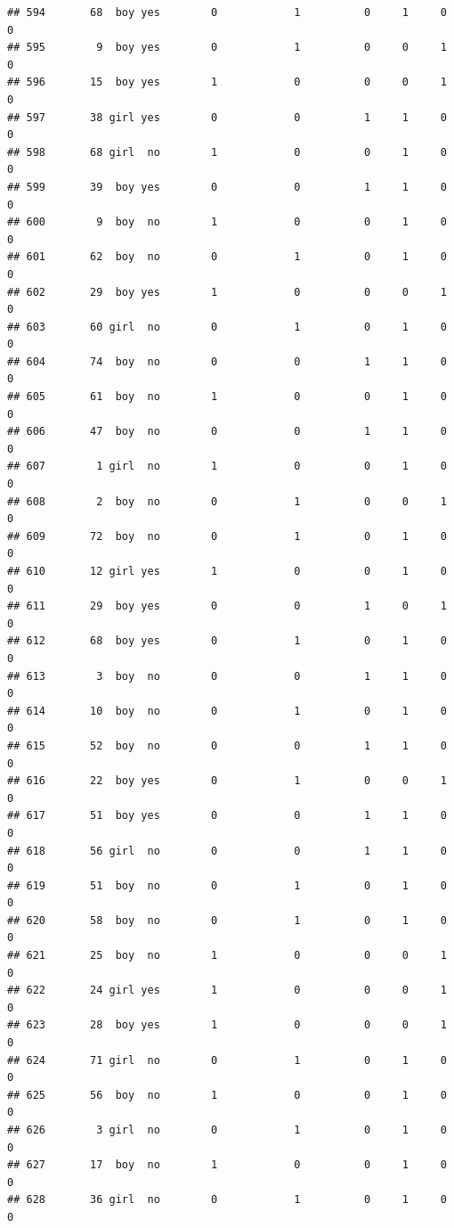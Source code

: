 \documentclass[man]{apa6}
\begin{document}
\begin{verbatim}
## 594       68  boy yes        0            1          0     1     0     0
## 595        9  boy yes        0            1          0     0     1     0
## 596       15  boy yes        1            0          0     0     1     0
## 597       38 girl yes        0            0          1     1     0     0
## 598       68 girl  no        1            0          0     1     0     0
## 599       39  boy yes        0            0          1     1     0     0
## 600        9  boy  no        1            0          0     1     0     0
## 601       62  boy  no        0            1          0     1     0     0
## 602       29  boy yes        1            0          0     0     1     0
## 603       60 girl  no        0            1          0     1     0     0
## 604       74  boy  no        0            0          1     1     0     0
## 605       61  boy  no        1            0          0     1     0     0
## 606       47  boy  no        0            0          1     1     0     0
## 607        1 girl  no        1            0          0     1     0     0
## 608        2  boy  no        0            1          0     0     1     0
## 609       72  boy  no        0            1          0     1     0     0
## 610       12 girl yes        1            0          0     1     0     0
## 611       29  boy yes        0            0          1     0     1     0
## 612       68  boy yes        0            1          0     1     0     0
## 613        3  boy  no        0            0          1     1     0     0
## 614       10  boy  no        0            1          0     1     0     0
## 615       52  boy  no        0            0          1     1     0     0
## 616       22  boy yes        0            1          0     0     1     0
## 617       51  boy yes        0            0          1     1     0     0
## 618       56 girl  no        0            0          1     1     0     0
## 619       51  boy  no        0            1          0     1     0     0
## 620       58  boy  no        0            1          0     1     0     0
## 621       25  boy  no        1            0          0     0     1     0
## 622       24 girl yes        1            0          0     0     1     0
## 623       28  boy yes        1            0          0     0     1     0
## 624       71 girl  no        0            1          0     1     0     0
## 625       56  boy  no        1            0          0     1     0     0
## 626        3 girl  no        0            1          0     1     0     0
## 627       17  boy  no        1            0          0     1     0     0
## 628       36 girl  no        0            1          0     1     0     0

\end{verbatim}
\end{document}

